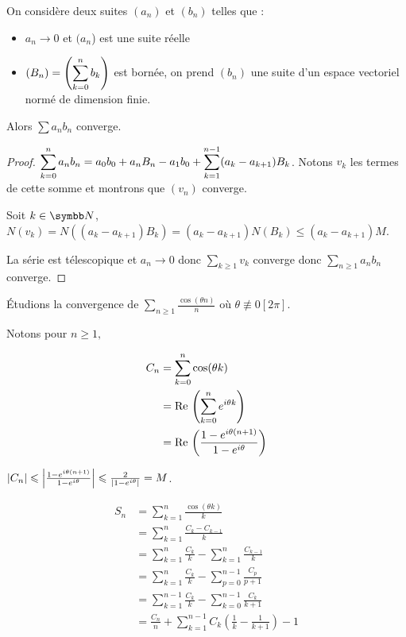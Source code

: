 \begin{theoreme}{}{}
    On considère deux suites $(a_n)$ et $(b_n)$ telles que :
    \begin{itemize}
        \item $a_n \to 0$ et $(a_n$) est une suite réelle
        \item $\displaystyle (B_n) = \left(\sum_{k=0}^n b_k\right)$ est bornée, on prend $(b_n)$ une suite d'un espace vectoriel normé de dimension finie.
    \end{itemize}

    Alors $\sum a_n b_n$ converge.
\end{theoreme}

\begin{proof}
$\displaystyle \sum_{k=0}^n a_n b_n = a_0 b_0 + a_n B_n - a_1 b_0 + \sum_{k=1}^{n-1} (a_k - a_{k+1}) B_k$. Notons $v_k$ les termes de cette somme et montrons que $(v_n)$ converge.

Soit $k \in \N$, $N(v_k) = N((a_k - a_{k+1}) B_k) = (a_k - a_{k+1}) N(B_k) \leqslant (a_{k} - a_{k+1}) M$.

La série est télescopique et $a_n \to 0$ donc $\sum_{k\geqslant 1} v_k$ converge donc $\sum_{n \geqslant 1} a_n b_n$ converge.
\end{proof}

Étudions la convergence de $\sum_{n \geqslant 1} \frac{\cos(\theta n)}{n}$ où $\theta \not \equiv 0 [2\pi]$.

Notons pour $n \geqslant 1, $

\begin{align*}
    C_n & = \sum_{k = 0}^{n} \cos(\theta k) \\
        & = \operatorname{Re} \, \left( \sum_{k = 0}^{n} e^{i \theta k} \right) \\
        & = \operatorname{Re} \, \left( \frac{1 - e^{i \theta (n + 1)}}{1 - e^{i \theta}} \right) 
\end{align*}

$\left|C_n\right| \leqslant \left|\frac{1 - e^{i \theta (n + 1)}}{1 - e^{i \theta}}\right| \leqslant \frac{2}{\left|1 - e^{i \theta}\right|} = M$.

{\allowdisplaybreaks
\begin{align*}
    S_n & = \sum_{k = 1}^{n} \frac{\cos(\theta k)}{k} \\
        & = \sum_{k = 1}^{n} \frac{C_k - C_{k - 1}}{k} \\
        & = \sum_{k = 1}^{n} \frac {C_k} k - \sum_{k = 1}^{n} \frac{C_{k - 1}}{k} \\
        & = \sum_{k = 1}^{n} \frac{C_k}{k} - \sum_{p = 0}^{n - 1} \frac{C_p}{p + 1} \\
        & = \sum_{k = 1}^{n - 1} \frac{C_k}{k} - \sum_{k = 0 }^{n - 1 } \frac{C_k}{k + 1} \\
        & = \frac{C_n} n + \sum_{k = 1}^{n - 1} C_k \left( \frac 1 k - \frac 1 {k + 1} \right) - 1 
\end{align*}
}

